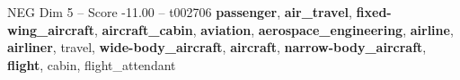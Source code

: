 \begin{textsample}{NEG Dim 5 – Score -11.00 – t002706}  \label{ex:f5_neg_039}
\textbf{passenger}, \textbf{air\_travel}, \textbf{fixed-wing\_aircraft}, \textbf{aircraft\_cabin}, \textbf{aviation}, \textbf{aerospace\_engineering}, \textbf{airline}, \textbf{airliner}, travel, \textbf{wide-body\_aircraft}, \textbf{aircraft}, \textbf{narrow-body\_aircraft}, \textbf{flight}, cabin, flight\_attendant

\end{textsample}
